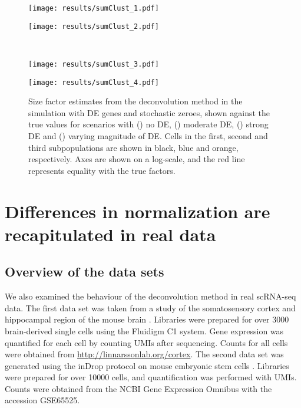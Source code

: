 \documentclass{article}
\begin{document}
\begin{figure}[btp]
\begin{center}
\begin{minipage}{0.33\textwidth}
    \texttt{[image: results/sumClust\_1.pdf]}
    \subcaption{}\label{subfig:sumclust_1}
\end{minipage}
\begin{minipage}{0.33\textwidth}
    \texttt{[image: results/sumClust\_2.pdf]}
    \subcaption{}\label{subfig:sumclust_2}
\end{minipage}  \\ 
\begin{minipage}{0.33\textwidth}
    \texttt{[image: results/sumClust\_3.pdf]}
    \subcaption{}\label{subfig:sumclust_3}
\end{minipage}
\begin{minipage}{0.33\textwidth}
    \texttt{[image: results/sumClust\_4.pdf]}
    \subcaption{}\label{subfig:sumclust_4}
\end{minipage}
\end{center}
    \caption{
        Size factor estimates from the deconvolution method in the simulation with DE genes and stochastic zeroes,
        shown against the true values for scenarios with () no DE, () moderate DE, 
                () strong DE and () varying magnitude of DE.
        Cells in the first, second and third subpopulations are shown in black, blue and orange, respectively.
        Axes are shown on a log-scale, and the red line represents equality with the true factors.
    }
    \label{fig:sim_cluster_DE}
\end{figure}

\section{Differences in normalization are recapitulated in real data}

\subsection{Overview of the data sets}
We also examined the behaviour of the deconvolution method in real scRNA-seq data.
The first data set was taken from a study of the somatosensory cortex and hippocampal region of the mouse brain \cite{zeisel2015brain}.
Libraries were prepared for over 3000 brain-derived single cells using the Fluidigm C1 system.
Gene expression was quantified for each cell by counting UMIs after sequencing.
Counts for all cells were obtained from \url{http://linnarssonlab.org/cortex}.
The second data set was generated using the inDrop protocol on mouse embryonic stem cells \cite{klein2015droplet}.
Libraries were prepared for over 10000 cells, and quantification was performed with UMIs.
Counts were obtained from the NCBI Gene Expression Omnibus with the accession GSE65525.
\end{document}
